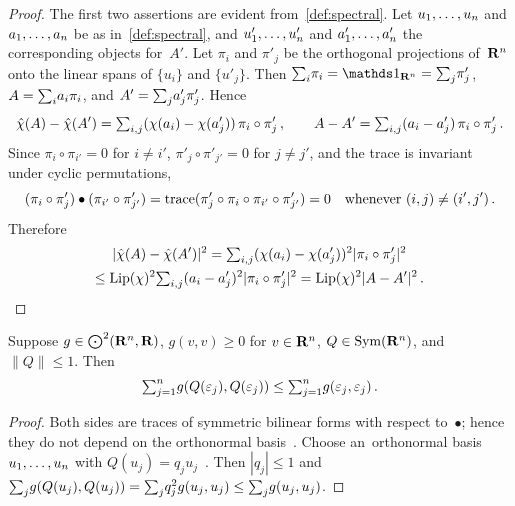 \documentclass[a4paper,twoside,leqno]{article}
\begin{document}
\begin{proof}
    The first two assertions are evident from~\ref{def:spectral}. Let $u_1, \ldots, u_{n}$ and
    $a_1, \ldots, a_{n}$ be as in~\ref{def:spectral}, and $u'_1, \ldots, u'_{n}$ and
    $a'_1, \ldots, a'_{n}$ the corresponding objects for~$A'$. Let $\pi_i$ and $\pi'_j$ be the
    orthogonal projections of~$\mathbf{R}^{n}$ onto the linear spans of $\{u_i\}$ and $\{u'_j\}$. Then
    $\textsum{i}{} \pi_i = \id{\R^{\adim}} = \textsum{j}{} \pi'_j$, $A = {\textstyle\sum_{i}^{}} a_i \pi_i$,
    and $A' = {\textstyle\sum_{j}^{}} a'_j \pi'_j$. Hence
    \begin{displaymath}
        \hat\chi(A) - \hat\chi(A') = {\textstyle\sum_{i,j}^{}} (\chi(a_i) - \chi(a'_j)) \, \pi_i \circ \pi'_j
        \,, \qquad
        A - A' = {\textstyle\sum_{i,j}^{}} (a_i - a'_j) \, \pi_i \circ \pi'_j \,.
    \end{displaymath}
    Since $\pi_i \circ \pi_{i'} = 0$ for $i \ne i'$, $\pi'_j \circ \pi'_{j'} = 0$ for $j \ne j'$,
    and the trace is invariant under cyclic permutations,
    \begin{displaymath}
        (\pi_i \circ \pi'_j) \bullet (\pi_{i'} \circ \pi'_{j'})
        = \operatorname{trace}(\pi'_j \circ \pi_i \circ \pi_{i'} \circ \pi'_{j'}) = 0
        \quad \text{whenever $(i,j) \ne (i',j')$} \,.
    \end{displaymath}
    Therefore
    \begin{multline*}
        |\hat\chi(A) - \hat\chi(A')|^2 = {\textstyle\sum_{i,j}^{}} (\chi(a_i) - \chi(a'_j))^2 |\pi_i \circ
        \pi'_j|^2 \\
        \le \operatorname{Lip}(\chi)^2 {\textstyle\sum_{i,j}^{}} (a_i - a'_j)^2 |\pi_i \circ \pi'_j|^2 =
        \operatorname{Lip}(\chi)^2 |A - A'|^2 \,. \qedhere
    \end{multline*}
\end{proof}

\begin{lemma}
    \label{lem:trace}
    Suppose $g \in \textstyle\bigodot^2(\mathbf{R}^{n},\mathbf{R})$, $g(v,v) \ge 0$ for $v \in \mathbf{R}^{n}$, $Q
    \in \mathrm{Sym}({\mathbf{R}^{n}})$, and $\|Q\| \le 1$. Then
    \begin{displaymath}
        {\textstyle\sum_{j=1}^{n}} g(Q(\varepsilon_j),Q(\varepsilon_j)) \le {\textstyle\sum_{j=1}^{n}}
        g(\varepsilon_j,\varepsilon_j) \,.
    \end{displaymath}
\end{lemma}

\begin{proof}
    Both sides are traces of symmetric bilinear forms with respect to~$\bullet$; hence they do not
    depend on the orthonormal basis~\cite[1.7.10]{Federer1969}. Choose an~orthonormal basis $u_1,
    \ldots, u_{n}$ with $Q(u_j) = q_j u_j$~\cite[1.7.3]{Federer1969}. Then $|q_j| \le 1$ and
    ${\textstyle\sum_{j}^{}} g(Q(u_j),Q(u_j)) = {\textstyle\sum_{j}^{}} q_j^2 g(u_j,u_j) \le {\textstyle\sum_{j}^{}}
    g(u_j,u_j)$.
\end{proof}
\end{document}
